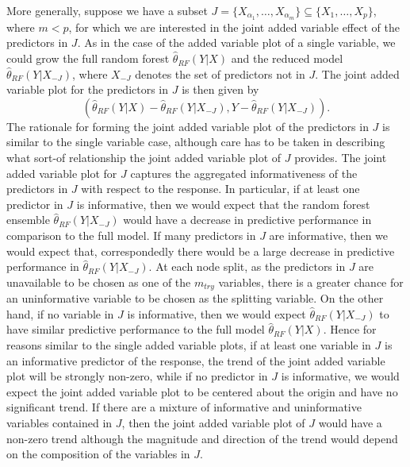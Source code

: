 \documentclass[12pt,twoside]{reedthesis}
\theoremstyle{definition}
\theoremstyle{definition}
\theoremstyle{definition}
\theoremstyle{remark}
\begin{document}
More generally, suppose we have a subset
\(J=\{X_{\alpha_1},\ldots, X_{\alpha_m}\}\subseteq \{X_1,\ldots,X_p\}\),
where \(m< p\), for which we are interested in the joint added variable
effect of the predictors in \(J\). As in the case of the added variable
plot of a single variable, we could grow the full random forest
\(\hat{\theta}_{RF}(Y|X)\) and the reduced model
\(\hat{\theta}_{RF}(Y|X_{-J})\), where \(X_{-J}\) denotes the set of
predictors not in \(J\). The joint added variable plot for the
predictors in \(J\) is then given by
\[(\hat{\theta}_{RF}(Y|X)-\hat{\theta}_{RF}(Y|X_{-J}), Y-\hat{\theta}_{RF}(Y|X_{-J})).\]
The rationale for forming the joint added variable plot of the
predictors in \(J\) is similar to the single variable case, although
care has to be taken in describing what sort-of relationship the joint
added variable plot of \(J\) provides. The joint added variable plot for
\(J\) captures the aggregated informativeness of the predictors in \(J\)
with respect to the response. In particular, if at least one predictor
in \(J\) is informative, then we would expect that the random forest
ensemble \(\hat{\theta}_{RF}(Y|X_{-J})\) would have a decrease in
predictive performance in comparison to the full model. If many
predictors in \(J\) are informative, then we would expect that,
correspondedly there would be a large decrease in predictive performance
in \(\hat{\theta}_{RF}(Y|X_{-J})\). At each node split, as the
predictors in \(J\) are unavailable to be chosen as one of the
\(m_{try}\) variables, there is a greater chance for an uninformative
variable to be chosen as the splitting variable. On the other hand, if
no variable in \(J\) is informative, then we would expect
\(\hat{\theta}_{RF}(Y|X_{-J})\) to have similar predictive performance
to the full model \(\hat{\theta}_{RF}(Y|X)\). Hence for reasons similar
to the single added variable plots, if at least one variable in \(J\) is
an informative predictor of the response, the trend of the joint added
variable plot will be strongly non-zero, while if no predictor in \(J\)
is informative, we would expect the joint added variable plot to be
centered about the origin and have no significant trend. If there are a
mixture of informative and uninformative variables contained in \(J\),
then the joint added variable plot of \(J\) would have a non-zero trend
although the magnitude and direction of the trend would depend on the
composition of the variables in \(J\). \par
\end{document}
